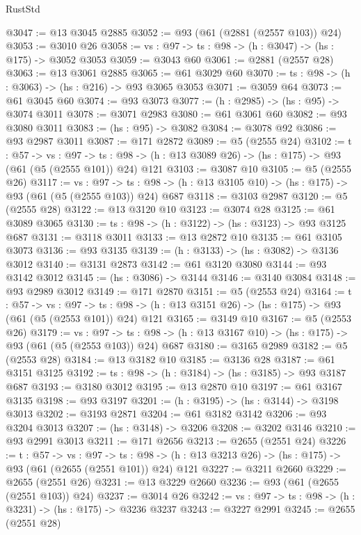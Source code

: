 \begin{lexlean}{RustStd}
\begin{coremodule}
@3047 := @13 @3045 @2885
@3052 := @93 (@61 (@2881 (@2557 @103)) @24)
@3053 := @3010 @26
@3058 := {vs : @97} -> {ts : @98} -> (h : @3047) -> (hs : @175) -> @3052 @3053
@3059 := @3043 @60
@3061 := @2881 (@2557 @28)
@3063 := @13 @3061 @2885
@3065 := @61 @3029 @60
@3070 := {ts : @98} -> (h : @3063) -> (hs : @216) -> @93 @3065 @3053
@3071 := @3059 @64
@3073 := @61 @3045 @60
@3074 := @93 @3073
@3077 := (h : @2985) -> (hs : @95) -> @3074 @3011
@3078 := @3071 @2983
@3080 := @61 @3061 @60
@3082 := @93 @3080 @3011
@3083 := (hs : @95) -> @3082
@3084 := @3078 @92
@3086 := @93 @2987 @3011
@3087 := @171 @2872
@3089 := @5 (@2555 @24)
@3102 := {t : @57} ->
  {vs : @97} ->
  {ts : @98} -> (h : @13 @3089 @26) -> (hs : @175) -> @93 (@61 (@5 (@2555 @101)) @24) @121
@3103 := @3087 @10
@3105 := @5 (@2555 @26)
@3117 := {vs : @97} ->
  {ts : @98} -> (h : @13 @3105 @10) -> (hs : @175) -> @93 (@61 (@5 (@2555 @103)) @24) @687
@3118 := @3103 @2987
@3120 := @5 (@2555 @28)
@3122 := @13 @3120 @10
@3123 := @3074 @28
@3125 := @61 @3089 @3065
@3130 := {ts : @98} -> (h : @3122) -> (hs : @3123) -> @93 @3125 @687
@3131 := @3118 @3011
@3133 := @13 @2872 @10
@3135 := @61 @3105 @3073
@3136 := @93 @3135
@3139 := (h : @3133) -> (hs : @3082) -> @3136 @3012
@3140 := @3131 @2873
@3142 := @61 @3120 @3080
@3144 := @93 @3142 @3012
@3145 := (hs : @3086) -> @3144
@3146 := @3140 @3084
@3148 := @93 @2989 @3012
@3149 := @171 @2870
@3151 := @5 (@2553 @24)
@3164 := {t : @57} ->
  {vs : @97} ->
  {ts : @98} -> (h : @13 @3151 @26) -> (hs : @175) -> @93 (@61 (@5 (@2553 @101)) @24) @121
@3165 := @3149 @10
@3167 := @5 (@2553 @26)
@3179 := {vs : @97} ->
  {ts : @98} -> (h : @13 @3167 @10) -> (hs : @175) -> @93 (@61 (@5 (@2553 @103)) @24) @687
@3180 := @3165 @2989
@3182 := @5 (@2553 @28)
@3184 := @13 @3182 @10
@3185 := @3136 @28
@3187 := @61 @3151 @3125
@3192 := {ts : @98} -> (h : @3184) -> (hs : @3185) -> @93 @3187 @687
@3193 := @3180 @3012
@3195 := @13 @2870 @10
@3197 := @61 @3167 @3135
@3198 := @93 @3197
@3201 := (h : @3195) -> (hs : @3144) -> @3198 @3013
@3202 := @3193 @2871
@3204 := @61 @3182 @3142
@3206 := @93 @3204 @3013
@3207 := (hs : @3148) -> @3206
@3208 := @3202 @3146
@3210 := @93 @2991 @3013
@3211 := @171 @2656
@3213 := @2655 (@2551 @24)
@3226 := {t : @57} ->
  {vs : @97} ->
  {ts : @98} -> (h : @13 @3213 @26) -> (hs : @175) -> @93 (@61 (@2655 (@2551 @101)) @24) @121
@3227 := @3211 @2660
@3229 := @2655 (@2551 @26)
@3231 := @13 @3229 @2660
@3236 := @93 (@61 (@2655 (@2551 @103)) @24)
@3237 := @3014 @26
@3242 := {vs : @97} -> {ts : @98} -> (h : @3231) -> (hs : @175) -> @3236 @3237
@3243 := @3227 @2991
@3245 := @2655 (@2551 @28)

\end{coremodule}
\end{lexlean}
